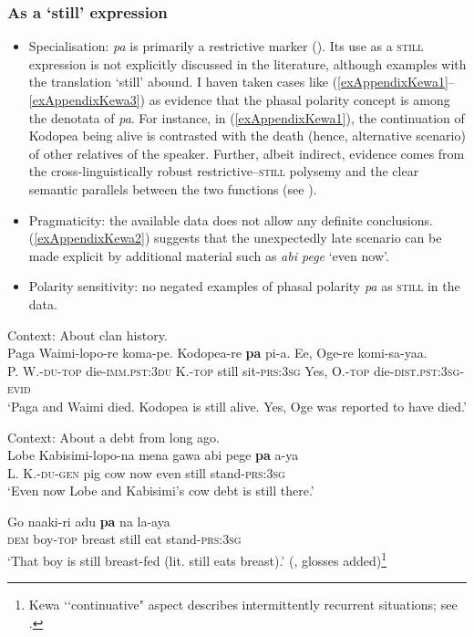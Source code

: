 \subsubsection{As a \lq{}still\rq{ }expression}
\begin{itemize}
	\item Specialisation: \textit{pa} is primarily a restrictive marker (). Its use as a \textsc{still} expression is not explicitly discussed in the literature, although examples with the translation \lq still' abound. I haven taken cases like (\ref{exAppendixKewa1}–\ref{exAppendixKewa3}) as evidence that the phasal polarity concept is among the denotata of \textit{pa}. For instance, in (\ref{exAppendixKewa1}), the continuation of Kodopea being alive is contrasted with the death (hence, alternative scenario) of other relatives of the speaker. Further, albeit indirect, evidence comes from the cross-linguistically robust restrictive–\textsc{still} polysemy and the clear semantic parallels between the two functions (see ).
	\item Pragmaticity: the available data does not allow any definite conclusions. (\ref{exAppendixKewa2}) suggests that the unexpectedly late scenario can be made explicit by additional material such as \textit{abi pege} \lq even now'.
	\item Polarity sensitivity: no negated examples of phasal polarity \textit{pa} as \textsc{still} in the data.
\end{itemize}

\begin{exe}
	\ex \label{exAppendixKewa1}
	Context: About clan history.\\
	\gll Paga Waimi-lopo-re koma-pe. Kodopea-re \textbf{pa} pi-a. Ee, Oge-re komi-sa-yaa.\\
	P. W.-\textsc{du}-\textsc{top} die-\textsc{imm.pst}:3\textsc{du} K.-\textsc{top} still sit-\textsc{prs}:3\textsc{sg} Yes, O.-\textsc{top} die-\textsc{dist.pst}:3\textsc{sg}-\textsc{evid}\\
	\glt \lq Paga and Waimi died. Kodopea is still alive. Yes, Oge was reported to have died.' \parencite[345]{Yarapea2006}

	\ex \label{exAppendixKewa2}
	Context: About a debt from long ago.\\
	\gll Lobe Kabisimi-lopo-na mena gawa abi pege \textbf{pa} a-ya\\
L. K.-\textsc{du}-\textsc{gen} pig cow now even still stand-\textsc{prs}:3\textsc{sg}\\
	\glt \lq Even now Lobe and Kabisimi’s cow debt is still there.\rq{ }\parencite[336]{Yarapea2006}

	\ex \label{exAppendixKewa3}
	\gll Go naaki-ri adu \textbf{pa} na la-aya\\
	\textsc{dem} boy-\textsc{top} breast still eat stand-\textsc{prs}:3\textsc{sg}\\
	\glt \lq That boy is still breast-fed (lit. still eats breast).\rq{ }(\cite[7]{Franklin2007}, glosses added)\footnote{Kewa \lq\lq continuative" aspect describes intermittently recurrent situations; see \textcite[243–244]{Yarapea2006}.}
\end{exe}
\pagebreak
